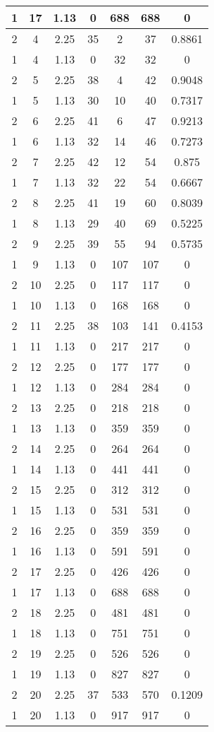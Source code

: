 \documentclass[letterpaper, 12pt]{article}
\begin{document}
\begin{longtable}{|c|c|c|c|c|c|c|}
1 & 17 & 1.13 & 0 & 688 & 688 & 0 \\
\hline
2 & 4 & 2.25 & 35 & 2 & 37 & 0.8861 \\
\hline
1 & 4 & 1.13 & 0 & 32 & 32 & 0 \\
\hline
2 & 5 & 2.25 & 38 & 4 & 42 & 0.9048 \\
\hline
1 & 5 & 1.13 & 30 & 10 & 40 & 0.7317 \\
\hline
2 & 6 & 2.25 & 41 & 6 & 47 & 0.9213 \\
\hline
1 & 6 & 1.13 & 32 & 14 & 46 & 0.7273 \\
\hline
2 & 7 & 2.25 & 42 & 12 & 54 & 0.875 \\
\hline
1 & 7 & 1.13 & 32 & 22 & 54 & 0.6667 \\
\hline
2 & 8 & 2.25 & 41 & 19 & 60 & 0.8039 \\
\hline
1 & 8 & 1.13 & 29 & 40 & 69 & 0.5225 \\
\hline
2 & 9 & 2.25 & 39 & 55 & 94 & 0.5735 \\
\hline
1 & 9 & 1.13 & 0 & 107 & 107 & 0 \\
\hline
2 & 10 & 2.25 & 0 & 117 & 117 & 0 \\
\hline
1 & 10 & 1.13 & 0 & 168 & 168 & 0 \\
\hline
2 & 11 & 2.25 & 38 & 103 & 141 & 0.4153 \\
\hline
1 & 11 & 1.13 & 0 & 217 & 217 & 0 \\
\hline
2 & 12 & 2.25 & 0 & 177 & 177 & 0 \\
\hline
1 & 12 & 1.13 & 0 & 284 & 284 & 0 \\
\hline
2 & 13 & 2.25 & 0 & 218 & 218 & 0 \\
\hline
1 & 13 & 1.13 & 0 & 359 & 359 & 0 \\
\hline
2 & 14 & 2.25 & 0 & 264 & 264 & 0 \\
\hline
1 & 14 & 1.13 & 0 & 441 & 441 & 0 \\
\hline
2 & 15 & 2.25 & 0 & 312 & 312 & 0 \\
\hline
1 & 15 & 1.13 & 0 & 531 & 531 & 0 \\
\hline
2 & 16 & 2.25 & 0 & 359 & 359 & 0 \\
\hline
1 & 16 & 1.13 & 0 & 591 & 591 & 0 \\
\hline
2 & 17 & 2.25 & 0 & 426 & 426 & 0 \\
\hline
1 & 17 & 1.13 & 0 & 688 & 688 & 0 \\
\hline
2 & 18 & 2.25 & 0 & 481 & 481 & 0 \\
\hline
1 & 18 & 1.13 & 0 & 751 & 751 & 0 \\
\hline
2 & 19 & 2.25 & 0 & 526 & 526 & 0 \\
\hline
1 & 19 & 1.13 & 0 & 827 & 827 & 0 \\
\hline
2 & 20 & 2.25 & 37 & 533 & 570 & 0.1209 \\
\hline
1 & 20 & 1.13 & 0 & 917 & 917 & 0 \\
\hline
\end{longtable}
\end{document}
